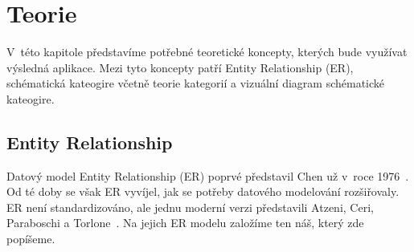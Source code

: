 \chapter{Teorie}

V~této kapitole představíme potřebné teoretické koncepty, kterých bude využívat výsledná aplikace.
Mezi tyto koncepty patří Entity Relationship (ER), schématická kateogire včetně teorie kategorií a vizuální diagram schématické kateogire.

\section{Entity Relationship}

Datový model Entity Relationship (ER) poprvé představil Chen už v~roce 1976~\cite{chen_entity-relationship_1976}.
Od té doby se však ER vyvíjel, jak se potřeby datového modelování rozšiřovaly.
ER není standardizováno, ale jednu moderní verzi představili Atzeni, Ceri, Paraboschi a Torlone~\cite[s.~163-179]{atzeni_database_1999}.
Na jejich ER modelu založíme ten náš, který zde popíšeme.

